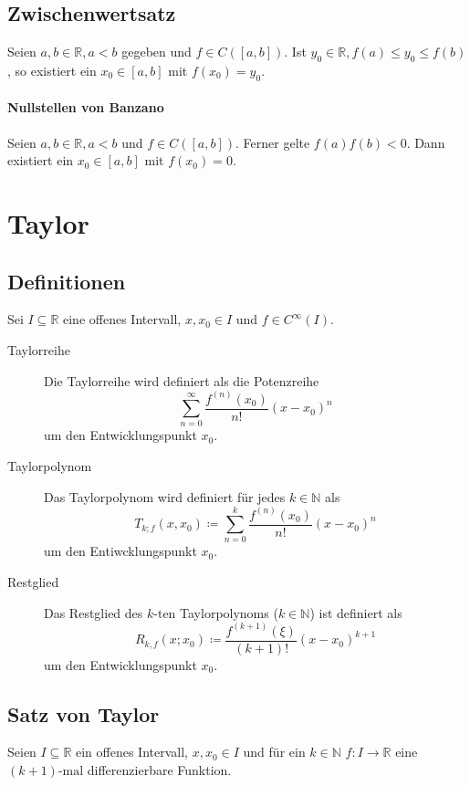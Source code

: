 \documentclass[a4paper, 11pt, accentcolor = tud3b]{tudreport}
\begin{document}
            \subsection{Zwischenwertsatz}
                Seien $ a, b \in \mathbb{R}, a < b $ gegeben und $ f \in C([a, b]) $. Ist $ y _ 0 \in \mathbb{R}, f(a) \leq y _ 0 \leq f(b) $, so existiert ein $ x _ 0 \in [a, b] $ mit $ f(x _ 0) = y _ 0 $.

                \paragraph{Nullstellen von Banzano}
                    Seien $ a, b \in \mathbb{R}, a < b $ und $ f \in C([a, b]) $. Ferner gelte $ f(a)f(b) < 0 $. Dann existiert ein $ x _ 0 \in [a, b] $ mit $ f(x _ 0) = 0 $.

        \section{Taylor}
            \subsection{Definitionen}
                Sei $ I \subseteq \mathbb{R} $ eine offenes Intervall, $ x, x _ 0 \in I $ und $ f \in C ^ \infty (I) $.

                \begin{description}
                    \item[Taylorreihe] Die Taylorreihe wird definiert als die Potenzreihe \[ \sum _ { n = 0 } ^ \infty \frac{f ^ {(n)} (x _ 0)}{n!} (x - x _ 0) ^ n \] um den Entwicklungspunkt $ x _ 0 $.
                    \item[Taylorpolynom] Das Taylorpolynom wird definiert für jedes $ k \in \mathbb{N} $ als \[ T _ { k; f } (x, x _ 0) \coloneqq \sum _ { n = 0 } ^ k \frac{f ^ {(n)} (x _ 0)}{n!} (x - x _ 0) ^ n \] um den Entiwcklungspunkt $ x _ 0 $.
                    \item[Restglied] Das Restglied des $ k\text{-ten} $ Taylorpolynoms ($ k \in \mathbb{N} $) ist definiert als \[ R _ { k, f } (x; x _ 0) \coloneqq \frac{f ^ {(k + 1)} (\xi)}{(k + 1)!} (x - x _ 0) ^ { k + 1 } \] um den Entwicklungspunkt $ x _ 0 $.
                \end{description}

            \subsection{Satz von Taylor}
                Seien $ I \subseteq \mathbb{R} $ ein offenes Intervall, $ x, x _ 0 \in I $ und für ein $ k \in \mathbb{N} $ $ f : I \rightarrow \mathbb{R} $ eine $ (k + 1)\text{-mal} $ differenzierbare Funktion.
\end{document}

